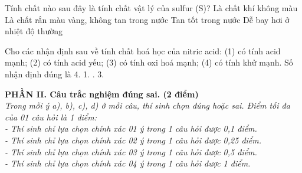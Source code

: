 \documentclass[12pt,a4paper]{article}
\begin{document}
\begin{ex}
Tính chất nào sau đây là tính chất vật lý của sulfur (S)?
\choice
{Là chất khí không màu}
{\True Là chất rắn màu vàng, không tan trong nước}
{Tan tốt trong nước}
{Dễ bay hơi ở nhiệt độ thường}
\end{ex}

\begin{ex}
Cho các nhận định sau về tính chất hoá học của nitric acid: (1) có tính acid mạnh; (2) có tính acid yếu; (3) có tính oxi hoá mạnh; (4) có tính khử mạnh. Số nhận định đúng là
\choice
{4.}
{1.}
{.}
{3.}
\end{ex}


\bigskip
\noindent
\textbf{PHẦN II. Câu trắc nghiệm đúng sai. (2 điểm)}\\
\textit{Trong mỗi ý a), b), c), d) ở mỗi câu, thí sinh chọn đúng hoặc sai. Điểm tối đa của 01 câu hỏi là 1 điểm:}\\
\textit{- Thí sinh chỉ lựa chọn chính xác 01 ý trong 1 câu hỏi được 0,1 điểm.}\\
\textit{- Thí sinh chỉ lựa chọn chính xác 02 ý trong 1 câu hỏi được 0,25 điểm.}\\
\textit{- Thí sinh chỉ lựa chọn chính xác 03 ý trong 1 câu hỏi được 0,5 điểm.}\\
\textit{- Thí sinh chỉ lựa chọn chính xác 04 ý trong 1 câu hỏi được 1 điểm.}
\end{document}

